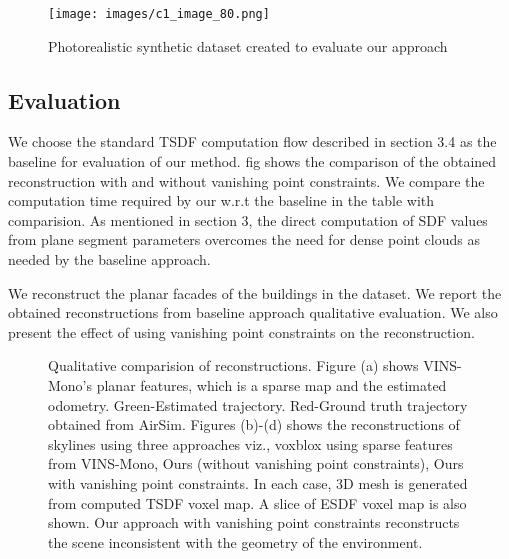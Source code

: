 \begin{figure}[h!]
  \centering
  \texttt{[image: images/c1\_image\_80.png]}
  \caption{Photorealistic synthetic dataset created to evaluate our approach}
\end{figure}

\subsection{Evaluation}
We choose the standard TSDF computation flow described in section 3.4 as the baseline for evaluation of our method. 
fig shows the comparison of the obtained reconstruction with and without vanishing point constraints. We compare the computation time required by our w.r.t the baseline in the table with comparision. As mentioned in section 3, the direct computation of SDF values from plane segment parameters overcomes the need for dense point clouds as needed by the baseline approach.

We reconstruct the planar facades of the buildings in the dataset. We report the obtained reconstructions from baseline approach  qualitative evaluation. We also present the effect of using vanishing point constraints on the reconstruction.

\begin{figure*}
  \centering
  \caption{Qualitative comparision of reconstructions. Figure (a) shows VINS-Mono's planar features, which is a sparse map and the estimated odometry. Green-Estimated trajectory. Red-Ground truth trajectory obtained from AirSim. Figures (b)-(d) shows the reconstructions of skylines using three approaches viz., voxblox using sparse features from VINS-Mono, Ours (without vanishing point constraints), Ours with vanishing point constraints. In each case, 3D mesh is generated from computed TSDF voxel map. A slice of ESDF voxel map is also shown. Our approach with vanishing point constraints reconstructs the scene inconsistent with the geometry of the environment.}
\end{figure*}

